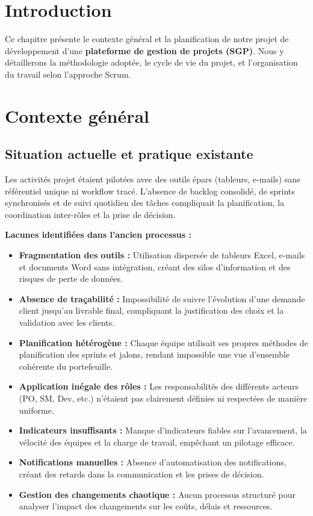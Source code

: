 \section{Introduction}

Ce chapitre présente le contexte général et la planification de notre projet de développement d'une \textbf{plateforme de gestion de projets (SGP)}. Nous y détaillerons la méthodologie adoptée, le cycle de vie du projet, et l'organisation du travail selon l'approche Scrum.

\section{Contexte général}

\subsection{Situation actuelle et pratique existante}

Les activités projet étaient pilotées avec des outils épars (tableurs, e-mails) sans référentiel unique ni workflow tracé. L'absence de backlog consolidé, de sprints synchronisés et de suivi quotidien des tâches compliquait la planification, la coordination inter-rôles et la prise de décision.

\textbf{Lacunes identifiées dans l'ancien processus :}
\begin{itemize}
    \item \textbf{Fragmentation des outils :} Utilisation dispersée de tableurs Excel, e-mails et documents Word sans intégration, créant des silos d'information et des risques de perte de données.
    \item \textbf{Absence de traçabilité :} Impossibilité de suivre l'évolution d'une demande client jusqu'au livrable final, compliquant la justification des choix et la validation avec les clients.
    \item \textbf{Planification hétérogène :} Chaque équipe utilisait ses propres méthodes de planification des sprints et jalons, rendant impossible une vue d'ensemble cohérente du portefeuille.
    \item \textbf{Application inégale des rôles :} Les responsabilités des différents acteurs (PO, SM, Dev, etc.) n'étaient pas clairement définies ni respectées de manière uniforme.
    \item \textbf{Indicateurs insuffisants :} Manque d'indicateurs fiables sur l'avancement, la vélocité des équipes et la charge de travail, empêchant un pilotage efficace.
    \item \textbf{Notifications manuelles :} Absence d'automatisation des notifications, créant des retards dans la communication et les prises de décision.
    \item \textbf{Gestion des changements chaotique :} Aucun processus structuré pour analyser l'impact des changements sur les coûts, délais et ressources.
\end{itemize}

